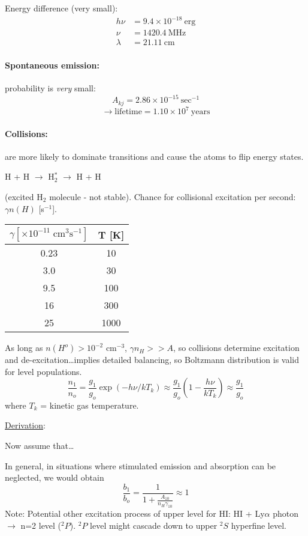 \documentclass[12pt]{article}
\newcommand{\mar}[1]{\hspace{0pt}\marginpar{-\textcolor{black}{#1}-}}
\begin{document}
Energy difference (very small):
\begin{align*}
    h\nu &= 9.4\times10^{-18}\:\mathrm{erg}\\
    \nu &= 1420.4\:\mathrm{MHz}\\
    \lambda &= 21.11\:\mathrm{cm}
\end{align*}

\paragraph{Spontaneous emission:} probability is \emph{very} small:
\[
    A_{kj} = 2.86\times10^{-15}\:\mathrm{sec}^{-1}
    \]
\[
    \rightarrow \mathrm{lifetime} = 1.10\times10^{7}\:\mathrm{years}
    \]
\paragraph{Collisions:}
are more likely to dominate transitions and cause the atoms to flip energy states.
\begin{center}
    H + H $\rightarrow$ H$_{2}^{*}$ $\rightarrow$ H + H
\end{center}
(excited H$_{2}$ molecule - not stable). Chance for collisional excitation
per second: $\gamma n(H)$ [s$^{-1}$].

\begin{center}
    \begin{tabular}{c c}
        $\gamma [\times10^{-11}\;\mathrm{cm}^{3}\mathrm{s}^{-1}]$ & T [K]\\
        \hline
        0.23 & 10\\
        3.0 & 30\\
        9.5 & 100\\
        16 & 300\\
        25 & 1000
    \end{tabular}
\end{center}
As long as $n(H^{o}) > 10^{-2}$ cm$^{-3}$, $\gamma n_{H} >> A$, so
collisions determine excitation and de-excitation\ldots implies
detailed balancing, so Boltzmann distribution is valid for level
populations.
\[
    \frac{n_{1}}{n_{o}} = \frac{g_{1}}{g_{o}}\exp(-h\nu/kT_{k})
    \approx \frac{g_{1}}{g_{o}}(1-\frac{h\nu}{kT_{k}}) \approx \frac{g_{1}}{g_{o}}
    \]
where $T_{k}$ = kinetic gas temperature.


\underline{Derivation}:\mar{35}

Now\mar{36} assume that\ldots

In general, in situations where stimulated emission and absorption can
be neglected, we would obtain
\[
    \frac{b_{1}}{b_{o}} = \frac{1}{1 + \frac{A_{10}}{n_{H}\gamma_{10}}}
    \approx 1
    \]
Note: Potential other excitation process of upper level for HI:
HI + Ly$\alpha$ photon $\rightarrow$ n=2 level ($^{2}P$). $^{2}P$ level might cascade
down to upper $^{2}S$ hyperfine level.
\end{document}
